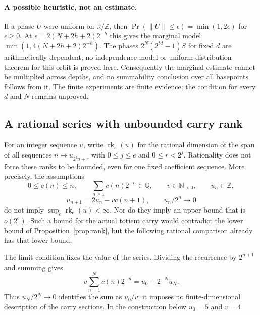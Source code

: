 \documentclass[11pt]{article}
\theoremstyle{plain}
\theoremstyle{definition}
\theoremstyle{remark}
\newcommand{\N}{\mathbb{N}}
\newcommand{\Z}{\mathbb{Z}}
\newcommand{\Q}{\mathbb{Q}}
\newcommand{\R}{\mathbb{R}}
\begin{document}
\paragraph{A possible heuristic, not an estimate.}
If a phase $U$ were uniform on $\R/\Z$, then
$\Pr(\|U\|\le\epsilon)=\min(1,2\epsilon)$ for $\epsilon\ge0$.
At $\epsilon=2(N+2h+2)2^{-h}$ this gives the marginal model
$\min(1,4(N+2h+2)2^{-h})$. The phases
$2^N(2^{td}-1)S$ for fixed $d$ are arithmetically dependent; no independence
model or uniform distribution theorem for this orbit is proved here.
Consequently the marginal estimate cannot be multiplied across depths, and
no summability conclusion over all basepoints follows from it. The finite
experiments are finite evidence; the condition for every $d$ and $N$
remains unproved.

\subsection{A rational series with unbounded carry rank}
\label{sub:generic-carry-rank}

For an integer sequence $u$, write $\operatorname{rk}_e(u)$ for the
rational dimension of the span of all sequences
$n\mapsto u_{2^j n+r}$ with $0\le j\le e$ and $0\le r<2^j$.
Rationality does not force these ranks to be bounded, even for one fixed
coefficient sequence. More precisely, the assumptions
\[
 0\le c(n)\le n,\qquad \sum_{n\ge1}c(n)2^{-n}\in\Q,
 \qquad v\in\N_{>0},\qquad u_n\in\Z,
\]
\[
 u_{n+1}=2u_n-vc(n+1),\qquad u_n/2^n\longrightarrow0
\]
do not imply $\sup_e\operatorname{rk}_e(u)<\infty$. Nor do they imply
an upper bound that is $o(2^e)$. Such a bound for the actual totient
carry would contradict the lower bound of Proposition~\ref{prop:rank},
but the following rational comparison already has that lower bound.

The limit condition fixes the value of the series. Dividing the
recurrence by $2^{n+1}$ and summing gives
\[
 v\sum_{n=1}^{N}c(n)2^{-n}=u_0-2^{-N}u_N.
\]
Thus $u_N/2^N\to0$ identifies the sum as $u_0/v$; it imposes no
finite-dimensional description of the carry sections. In the
construction below $u_0=5$ and $v=4$.
\end{document}
